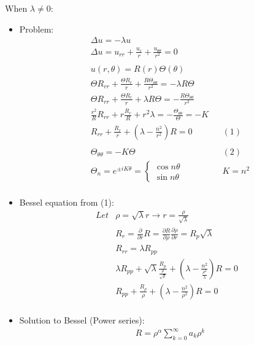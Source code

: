 \documentclass[12pt, a4paper]{article}
\begin{document}
When $\lambda \ne 0$:
\begin{itemize}
    \item Problem:
    \begin{align*}
        &\Delta u =-\lambda u\\
        &\Delta u = u_{rr}+\frac{u_r}{r}+\frac{u_{\theta\theta}}{r^2}=0\\\\
        &u(r, \theta) = R(r)\Theta(\theta)\\
        &\Theta R_{rr} + \frac{\Theta R_{r}}{r} + \frac{R\Theta_{\theta\theta}}{r^2} = -\lambda R\Theta\\
        &\Theta R_{rr} + \frac{\Theta R_{r}}{r} +\lambda R\Theta = -\frac{R\Theta_{\theta\theta}}{r^2} \\
        & \frac{r^2}{R}R_{rr} + r\frac{R_{r}}{R} +r^2\lambda = -\frac{\Theta_{\theta\theta}}{\Theta} = -K \\
        &R_{rr} + \frac{R_r}{r} + \left(\lambda - \frac{n^2}{r^2}\right) R = 0&&(1)\\\\
        &\Theta_{\theta\theta} = -K\Theta&&(2)\\
        &\Theta_n = e^{\pm iK\theta}= \begin{cases}
            \cos n\theta\\
            \sin n\theta
        \end{cases}&&K = n^2\\
    \end{align*}
    \item Bessel equation from (1):
    \begin{align*}
        Let &\rho = \sqrt{\lambda}r\rightarrow r = \frac{\rho}{\sqrt{\lambda}}\\
        &R_r = \frac{\partial}{\partial r}R = \frac{\partial R}{\partial \rho}\frac{\partial \rho}{\partial r} = R_p\sqrt{\lambda}\\
        &R_{rr} = \lambda R_{pp}\\
        &\lambda R_{pp} + \sqrt{\lambda}\frac{R_p}{\frac{\rho}{\sqrt{\rho}}} +  \left(\lambda - \frac{n^2}{\frac{\rho^2}{\lambda}}\right) R = 0 \\
        &R_{pp}+\frac{R_{\rho}}{\rho}+\left(\lambda - \frac{n^2}{\rho^2}\right) R = 0\\
    \end{align*}
    \item Solution to Bessel (Power series):
    \begin{align*}
        &R = \rho^\alpha \sum_{k=0}^\infty a_k \rho^k\\

\end{align*}
\end{itemize}
\end{document}
